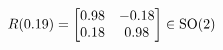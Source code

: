 \documentclass[preview]{standalone}
\begin{document}
\begin{align*}
\special{dvisvgm:raw <g id='unique000'>}R(0.19) = \begin{bmatrix} 0.98 & -0.18 \\ 0.18 & 0.98 \end{bmatrix} \in \text{SO}(2)\special{dvisvgm:raw </g>}
\end{align*}
\end{document}
